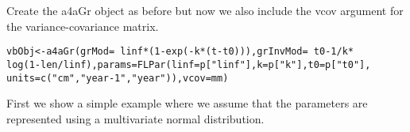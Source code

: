\documentclass[a4paper,english,10pt]{article}\usepackage[]{graphicx}\usepackage[]{color}
\makeatletter
\newcommand{\hlnum}[1]{\textcolor[rgb]{0.063,0.58,0.627}{#1}}%
\newcommand{\hlstr}[1]{\textcolor[rgb]{0.063,0.58,0.627}{#1}}%
\newcommand{\hlopt}[1]{\textcolor[rgb]{0.196,0.196,0.196}{#1}}%
\newcommand{\hlstd}[1]{\textcolor[rgb]{0.196,0.196,0.196}{#1}}%
\newcommand{\hlkwb}[1]{\textcolor[rgb]{0.627,0,0.314}{#1}}%
\newcommand{\hlkwc}[1]{\textcolor[rgb]{0,0.631,0.314}{#1}}%
\newcommand{\hlkwd}[1]{\textcolor[rgb]{0.78,0.227,0.412}{#1}}%
\newenvironment{kframe}{%
 \def\at@end@of@kframe{}%
 \ifinner\ifhmode%
  \def\at@end@of@kframe{\end{minipage}}%
  \begin{minipage}{\columnwidth}%
 \fi\fi%
 \def\FrameCommand##1{\hskip\@totalleftmargin \hskip-\fboxsep
 \colorbox{shadecolor}{##1}\hskip-\fboxsep
     \hskip-\linewidth \hskip-\@totalleftmargin \hskip\columnwidth}%
 \MakeFramed {\advance\hsize-\width
   \@totalleftmargin\z@ \linewidth\hsize
   \@setminipage}}%
 {\par\unskip\endMakeFramed%
 \at@end@of@kframe}
\newenvironment{knitrout}{}{} %
\makeatother
\begin{document}
Create the a4aGr object as before but now we also include the vcov argument for the variance-covariance matrix.
\begin{knitrout}
\color{fgcolor}\begin{kframe}
\begin{alltt}
\hlstd{vbObj} \hlkwb{<-} \hlkwd{a4aGr}\hlstd{(}\hlkwc{grMod} \hlstd{=} \hlopt{~}\hlstd{linf} \hlopt{*} \hlstd{(}\hlnum{1} \hlopt{-} \hlkwd{exp}\hlstd{(}\hlopt{-}\hlstd{k} \hlopt{*} \hlstd{(t} \hlopt{-} \hlstd{t0))),} \hlkwc{grInvMod} \hlstd{=} \hlopt{~}\hlstd{t0} \hlopt{-} \hlnum{1}\hlopt{/}\hlstd{k} \hlopt{*}
    \hlkwd{log}\hlstd{(}\hlnum{1} \hlopt{-} \hlstd{len}\hlopt{/}\hlstd{linf),} \hlkwc{params} \hlstd{=} \hlkwd{FLPar}\hlstd{(}\hlkwc{linf} \hlstd{= p[}\hlstr{"linf"}\hlstd{],} \hlkwc{k} \hlstd{= p[}\hlstr{"k"}\hlstd{],} \hlkwc{t0} \hlstd{= p[}\hlstr{"t0"}\hlstd{],}
    \hlkwc{units} \hlstd{=} \hlkwd{c}\hlstd{(}\hlstr{"cm"}\hlstd{,} \hlstr{"year-1"}\hlstd{,} \hlstr{"year"}\hlstd{)),} \hlkwc{vcov} \hlstd{= mm)}
\end{alltt}
\end{kframe}
\end{knitrout}

First we show a simple example where we assume that the parameters are represented using a multivariate normal distribution.
\end{document}
